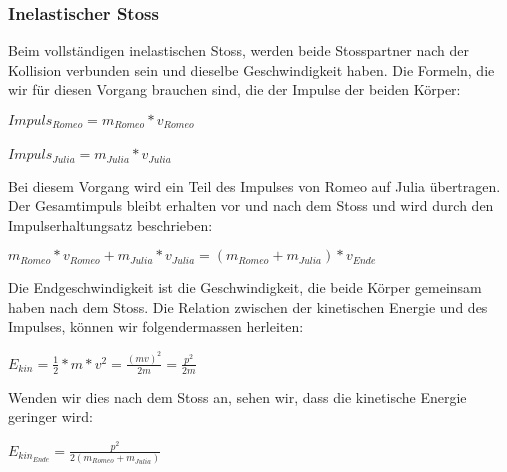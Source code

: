 \documentclass[../main.tex]{subfiles}
\begin{document}
\subsubsection{Inelastischer Stoss}
Beim vollständigen inelastischen Stoss, werden beide Stosspartner nach der Kollision verbunden sein und dieselbe
Geschwindigkeit haben\cite{tiplerpaula.PhysikFurStudierende}. Die Formeln, die wir für diesen Vorgang brauchen sind,
die der Impulse der beiden Körper:
\begin{mdframed}
$Impuls_{Romeo} = m_{Romeo}*v_{Romeo}$\\\\
$Impuls_{Julia} = m_{Julia}*v_{Julia}$
\end{mdframed}
 Bei diesem Vorgang wird ein Teil des Impulses von Romeo auf Julia übertragen. Der Gesamtimpuls bleibt erhalten vor
 und nach dem Stoss und wird durch den Impulserhaltungsatz beschrieben\cite{tiplerpaula.PhysikFurStudierende}:
\begin{mdframed}
$ m_{Romeo}*v_{Romeo} +  m_{Julia}*v_{Julia} = (m_{Romeo} + m_{Julia})*v_{Ende}$
\end{mdframed}
Die Endgeschwindigkeit ist die Geschwindigkeit, die beide Körper gemeinsam haben nach dem Stoss.\newline
Die Relation zwischen der kinetischen Energie und des Impulses, können wir folgendermassen
herleiten\cite{tiplerpaula.PhysikFurStudierende}:
\begin{mdframed}
$E_{kin}=\frac{1}{2} * m * v^{2} = \frac{(mv)^{2}}{2m} = \frac{p^{2}}{2m}$
\end{mdframed}
Wenden wir dies nach dem Stoss an, sehen wir, dass die kinetische Energie geringer wird:
\begin{mdframed}
$E_{kin_{Ende}}=\frac{p^{2}}{2(m_{Romeo} + m_{Julia})} $
\end{mdframed}
\end{document}
